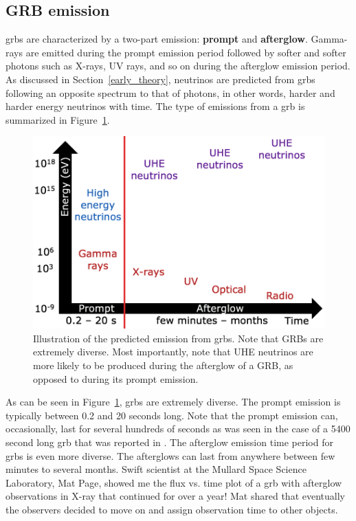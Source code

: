 \subsection{GRB emission}

\gls{grbs} are characterized by a two-part emission: {\bf prompt} and {\bf afterglow}. Gamma-rays are emitted during the prompt emission period followed by softer and softer photons such as X-rays, UV rays, and so on during the afterglow emission period. As discussed in  Section~\ref{early_theory}, neutrinos are predicted from \gls{grbs} following an opposite spectrum to that of photons, in other words, harder and harder energy neutrinos with time. The type of emissions from a \gls{grb} is summarized in Figure~\ref{grb_emission}. 

\begin{figure}
\centering
\includegraphics[width=1.0\textwidth]{figures/grb_emission.png}
\caption{Illustration of the predicted emission from \gls{grbs}. Note that GRBs are extremely diverse. Most importantly, note that UHE neutrinos are more likely to be produced during the afterglow of a GRB, as opposed to during its prompt emission.}
\label{grb_emission}
\end{figure}

As can be seen in Figure~\ref{grb_emission}, \gls{grbs} are extremely diverse. The prompt emission is typically between 0.2 and 20 seconds long. Note that the prompt emission can, occasionally, last for several hundreds of seconds as was seen in the case of a 5400 second long \gls{grb} that was reported in \cite{longhardgrb}. The afterglow emission time period for \gls{grbs} is even more diverse. The afterglows can last from anywhere between few minutes to several months. Swift scientist at the Mullard Space Science Laboratory, Mat Page, showed me the flux vs. time plot of a \gls{grb} with afterglow observations in X-ray that continued for over a year! 
Mat shared that eventually the observers 
decided to move on and assign observation time to other objects.

